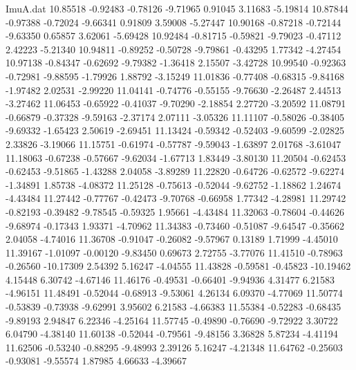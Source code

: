 \begin{filecontents}{ImuA.dat}
  10.85518   -0.92483   -0.78126   -9.71965    0.91045    3.11683   -5.19814
  10.87844   -0.97388   -0.72024   -9.66341    0.91809    3.59008   -5.27447
  10.90168   -0.87218   -0.72144   -9.63350    0.65857    3.62061   -5.69428
  10.92484   -0.81715   -0.59821   -9.79023   -0.47112    2.42223   -5.21340
  10.94811   -0.89252   -0.50728   -9.79861   -0.43295    1.77342   -4.27454
  10.97138   -0.84347   -0.62692   -9.79382   -1.36418    2.15507   -3.42728
  10.99540   -0.92363   -0.72981   -9.88595   -1.79926    1.88792   -3.15249
  11.01836   -0.77408   -0.68315   -9.84168   -1.97482    2.02531   -2.99220
  11.04141   -0.74776   -0.55155   -9.76630   -2.26487    2.44513   -3.27462
  11.06453   -0.65922   -0.41037   -9.70290   -2.18854    2.27720   -3.20592
  11.08791   -0.66879   -0.37328   -9.59163   -2.37174    2.07111   -3.05326
  11.11107   -0.58026   -0.38405   -9.69332   -1.65423    2.50619   -2.69451
  11.13424   -0.59342   -0.52403   -9.60599   -2.02825    2.33826   -3.19066
  11.15751   -0.61974   -0.57787   -9.59043   -1.63897    2.01768   -3.61047
  11.18063   -0.67238   -0.57667   -9.62034   -1.67713    1.83449   -3.80130
  11.20504   -0.62453   -0.62453   -9.51865   -1.43288    2.04058   -3.89289
  11.22820   -0.64726   -0.62572   -9.62274   -1.34891    1.85738   -4.08372
  11.25128   -0.75613   -0.52044   -9.62752   -1.18862    1.24674   -4.43484
  11.27442   -0.77767   -0.42473   -9.70768   -0.66958    1.77342   -4.28981
  11.29742   -0.82193   -0.39482   -9.78545   -0.59325    1.95661   -4.43484
  11.32063   -0.78604   -0.44626   -9.68974   -0.17343    1.93371   -4.70962
  11.34383   -0.73460   -0.51087   -9.64547   -0.35662    2.04058   -4.74016
  11.36708   -0.91047   -0.26082   -9.57967    0.13189    1.71999   -4.45010
  11.39167   -1.01097   -0.00120   -9.83450    0.69673    2.72755   -3.77076
  11.41510   -0.78963   -0.26560  -10.17309    2.54392    5.16247   -4.04555
  11.43828   -0.59581   -0.45823  -10.19462    4.15448    6.30742   -4.67146
  11.46176   -0.49531   -0.66401   -9.94936    4.31477    6.21583   -4.96151
  11.48491   -0.52044   -0.68913   -9.53061    4.26134    6.09370   -4.77069
  11.50774   -0.53839   -0.73938   -9.62991    3.95602    6.21583   -4.66383
  11.55384   -0.52283   -0.68435   -9.89193    2.94847    6.22346   -4.25164
  11.57745   -0.49890   -0.76690   -9.72922    3.30722    6.04790   -4.38140
  11.60138   -0.52044   -0.79561   -9.48156    3.36828    5.87234   -4.41194
  11.62506   -0.53240   -0.88295   -9.48993    2.39126    5.16247   -4.21348
  11.64762   -0.25603   -0.93081   -9.55574    1.87985    4.66633   -4.39667

\end{filecontents}
